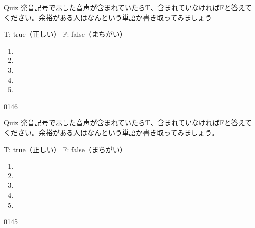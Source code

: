 \documentclass[aspectratio=169,xcolor={dvipsnames,table}]{beamer}
\begin{document}
\begin{frame}[plain]{Quiz }
\large
発音記号で示した音声が含まれていたらT、含まれていなければFと答えてください。余裕がある人はなんという単語か書き取ってみましょう

\hfill{}{\scriptsize T: true（正しい）\hspace{5pt} F: false（まちがい）}
 \begin{enumerate}
  \item \mbox{}\hspace{1\zw}
  \item \mbox{}\hspace{1\zw}
  \item \mbox{}\hspace{1\zw}
  \item \mbox{}\hspace{1\zw}
  \item \mbox{}\hspace{1\zw}
 \end{enumerate}

\hfill{\tiny 0146}\,{\scriptsize {}}
\end{frame}
\begin{frame}[plain]{Quiz }
\large
発音記号で示した音声が含まれていたらT、含まれていなければFと答えてください。余裕がある人はなんという単語か書き取ってみましょう。

\hfill{}{\scriptsize T: true（正しい）\hspace{5pt} F: false（まちがい）}
 \begin{enumerate}
  \item \mbox{}\visible<2->{T}\hspace{1\zw}
  \item \mbox{}\hspace{1\zw}
  \item \mbox{}\hspace{1\zw}
  \item \mbox{}\visible<5->{T}\hspace{1\zw}
  \item \mbox{}\hspace{1\zw}
 \end{enumerate}

\hfill{\tiny 0145}\,{\scriptsize {}}
\end{frame}
\end{document}
